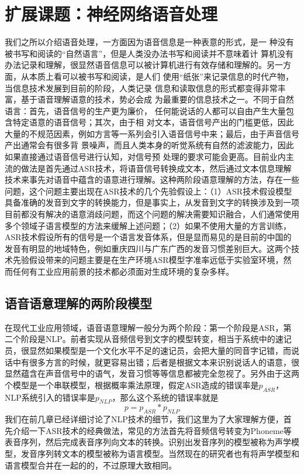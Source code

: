 \documentclass[twoside,a4paper,12pt]{book}%
\begin{document}
\chapter{扩展课题：神经网络语音处理}

我们之所以介绍语音处理，一方面因为语音信息是一种表意的形式，是一
种没有被书写和阅读的“自然语言”，但是人类没办法书写和阅读并不意味着计
算机没有办法记录和理解，很显然语音信息可以被计算机进行有效存储和理解的。另一方面，从本质上看可以被书写和阅读，是人们
使用“纸张”来记录信息的时代产物，当信息技术发展到目前的阶段，人类记录
信息和读取信息的形式都变得非常丰富，基于语音理解语意的技术，势必会成
为最重要的信息技术之一。不同于自然语言：首先，语音信号的生产更为廉价，
任何能说话的人都可以自由产生大量包含特定语意的语音信号；其次，由于相
对文本，语音信号产出的门槛更低，因此大量的不规范因素，例如方言等一系列会引入语音信号中来；最后，由于声音信号产出通常会有很多背
景噪声，而且人类本身的听觉系统有自然的滤波能力，因此如果直接通过语音信号进行认知，对信号预
处理的要求可能会更高。目前业内主流的做法是首先通过ASR技术，将语音信号转换成文本，然后通过文本信息理解技术来事先对语音中蕴含的语意进行理解。这种两阶段语意理解的方法，存在一些问题，这个问题主要出现在ASR技术的几个先验假设上：（1）ASR技术假设模型具备准确的发音到文字的转换能力，但是事实上，从发音到文字的转换涉及到一项目前都没有解决的语意消歧问题，而这个问题的解决需要知识融合，人们通常使用多个领域子语言模型的方法来缓解上述问题；（2）如果不使用大量的方言训练，ASR技术假设所有的信号是一个语言发音体系，但是显而易见的是目前的中国的发音有明显的地域特色，例如重庆四川与广东广西的发音习惯差别巨大。这两个技术先验假设带来的问题主要是在生产环境ASR模型字准率远低于实验室环境，然而任何有工业应用前景的技术都必须面对生成环境的复杂多样。

\section{语音语意理解的两阶段模型}
在现代工业应用领域，语音语意理解一般分为两个阶段：第一个阶段是ASR，第二个阶段是NLP。前者实现从音频信号到文字的模型转变，相当于系统中的速记员，很显然如果模型是一个文化水平不足的速记员，会把大量的同音字记错，而说话中有很多方言的时候，就更容易出错；后者是根据文本来识别说话人的语意，很显然蕴含在声音信号中的语气，发音习惯等等信息都被完全忽视了。另外由于这两个模型是一个串联模型，根据概率乘法原理，假定ASR造成的错误率是$p_{ASR}$，NLP系统引入的错误率是$p_{NLP}$，那么这个系统的错误率就是
$$
p=p_{ASR}*p_{NLP}
$$
我们在前几章已经详细讨论了NLP技术的细节，我们这里为了大家理解方便，首先介绍一下ASR技术的经典做法，常见的方法首先将音频信号转变为Phoneme等表音序列，然后完成表音序列向文本的转换。识别出发音序列的模型被称为声学模型，发音序列转文本的模型被称为语言模型。当然现在的研究者也有将声学模型和语言模型合并在一起的的，不过原理大致相同。
\end{document}
